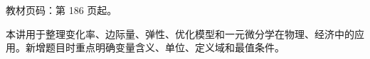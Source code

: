 
\begin{knowledgeBox}
教材页码：第 186 页起。

本讲用于整理变化率、边际量、弹性、优化模型和一元微分学在物理、经济中的应用。新增题目时重点明确变量含义、单位、定义域和最值条件。
\end{knowledgeBox}
